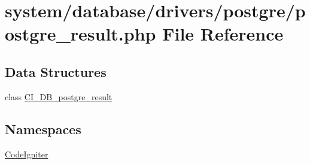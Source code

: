 \hypertarget{postgre__result_8php}{}\section{system/database/drivers/postgre/postgre\+\_\+result.php File Reference}
\label{postgre__result_8php}
\subsection*{Data Structures}
\begin{DoxyCompactItemize}
\item 
class \mbox{\hyperlink{class_c_i___d_b__postgre__result}{C\+I\+\_\+\+D\+B\+\_\+postgre\+\_\+result}}
\end{DoxyCompactItemize}
\subsection*{Namespaces}
\begin{DoxyCompactItemize}
\item 
 \mbox{\hyperlink{namespace_code_igniter}{Code\+Igniter}}
\end{DoxyCompactItemize}
